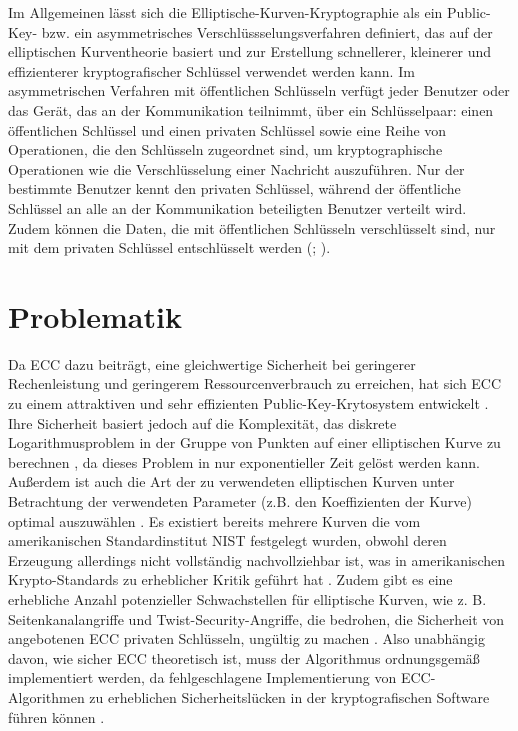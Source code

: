 Im Allgemeinen lässt sich die Elliptische-Kurven-Kryptographie als ein Public-Key- bzw. ein asymmetrisches Verschlüssselungsverfahren definiert, das auf der elliptischen Kurventheorie basiert und zur Erstellung schnellerer, kleinerer und effizienterer kryptografischer Schlüssel verwendet werden kann.
Im asymmetrischen Verfahren mit öffentlichen Schlüsseln verfügt jeder Benutzer oder das Gerät, das an der Kommunikation teilnimmt, über ein Schlüsselpaar: einen öffentlichen Schlüssel und einen privaten Schlüssel sowie eine Reihe von Operationen, die den Schlüsseln zugeordnet sind, um kryptographische Operationen wie die Verschlüsselung einer Nachricht auszuführen. 
Nur der bestimmte Benutzer kennt den privaten Schlüssel, während der öffentliche Schlüssel an alle an der Kommunikation beteiligten Benutzer verteilt wird. 
Zudem können die Daten, die mit öffentlichen Schlüsseln verschlüsselt sind, nur mit dem privaten Schlüssel entschlüsselt werden (\cite{edoh}; \cite{razad}). 

\section{Problematik}


Da ECC dazu beiträgt, eine gleichwertige Sicherheit bei geringerer Rechenleistung und geringerem Ressourcenverbrauch zu erreichen, hat sich ECC zu einem attraktiven und sehr effizienten Public-Key-Krytosystem entwickelt \cite{sosax}. 
Ihre Sicherheit basiert jedoch auf die Komplexität, das diskrete Logarithmusproblem in der Gruppe von Punkten auf einer elliptischen Kurve zu berechnen \cite{BSI}, da dieses Problem in nur exponentieller Zeit gelöst werden kann. 
Außerdem ist auch die Art der zu verwendeten elliptischen Kurven unter Betrachtung der verwendeten Parameter (z.B. den Koeffizienten der Kurve) optimal auszuwählen \cite{merLo}.
Es existiert bereits mehrere Kurven die vom amerikanischen Standardinstitut NIST festgelegt wurden, obwohl deren Erzeugung allerdings nicht vollständig nachvollziehbar ist, was in amerikanischen Krypto-Standards zu erheblicher Kritik geführt hat \cite{ securenet}. 
Zudem gibt es eine erhebliche Anzahl potenzieller Schwachstellen für elliptische Kurven, wie z. B. Seitenkanalangriffe und Twist-Security-Angriffe, die bedrohen, die Sicherheit von angebotenen ECC privaten Schlüsseln, ungültig zu machen \cite{stolbikova}.
Also unabhängig davon, wie sicher ECC theoretisch ist, muss der Algorithmus ordnungsgemäß implementiert werden, da fehlgeschlagene Implementierung von ECC-Algorithmen zu erheblichen Sicherheitslücken in der kryptografischen Software führen können \cite{stolbikova}. 

